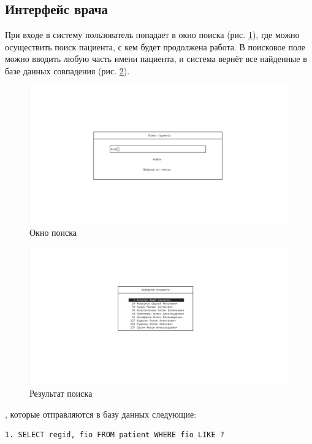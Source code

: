 \documentclass[14pt,a4paper,russian]{extreport}
\begin{document}
\subsection{Интерфейс врача}
При входе в систему пользователь попадает в окно поиска (рис. \ref{fig:search}), где можно осуществить поиск пациента, с кем будет продолжена работа.
В поисковое поле можно вводить любую часть имени пациента, и система вернёт все найденные в базе данных совпадения (рис. \ref{fig:search-result}).\par
\begin{figure}[h!]
        \includegraphics[width=\textwidth]{prog_int/search}
        \caption{Окно поиска}
        \label{fig:search}
\end{figure}
\begin{figure}[h!]
        \includegraphics[width=\textwidth]{prog_int/search-result}
        \caption{Результат поиска}
        \label{fig:search-result}
\end{figure}
, которые отправляются в базу данных следующие: 
\begin{lstlisting}[style=csql] 
1. SELECT regid, fio FROM patient WHERE fio LIKE ?
\end{lstlisting}
\end{document}
